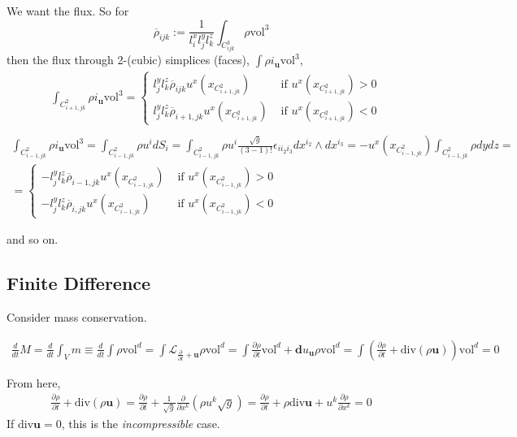 \documentclass[10pt]{amsart}
\begin{document}
\begin{multicols*}{2}
We want the flux.  So for
\[
\overline{\rho}_{ijk} := \frac{1}{l_i^x l_j^yl^z_k} \int_{C^3_{ijk}} \rho \text{vol}^3
\]
then the flux through 2-(cubic) simplices (faces), $\int \rho i_{\mathbf{u}}\text{vol}^3$,
\[
\begin{aligned}
 &  \int_{C^2_{i+1,jk}} \rho i_{\mathbf{u}} \text{vol}^3 = \begin{cases} l_j^yl_k^z \overline{\rho}_{ijk} u^x(x_{C^2_{i+1, jk} } ) & \text{ if } u^x(x_{C^2_{i+1,jk} }) > 0 \\ 
 l_j^y l^z_k \overline{\rho}_{i+1,jk} u^x(x_{C^2_{i+1, jk} } ) & \text{ if } u^x(x_{C^2_{i+1,jk} }) < 0 \end{cases} \\
\end{aligned}
\]
\[
\begin{gathered}
  \int_{C^2_{i-1,jk}} \rho i_{\mathbf{u}} \text{vol}^3 = \int_{C^2_{i-1,jk}} \rho u^i dS_i = \int_{C^2_{i-1,jk}} \rho u^i \frac{ \sqrt{g}}{ (3-1)!} \epsilon_{ii_2i_3} dx^{i_2} \wedge dx^{i_3} = -u^x(x_{C^2_{i-1,jk}}) \int_{C^2_{i-1,jk} } \rho dy dz = \\
  = \begin{cases}
    -l_j^y l^z_k \overline{\rho}_{i-1,jk} u^x(x_{C^2_{i-1,jk}}) & \text{ if } u^x(x_{C^2_{i-1,jk}}) > 0 \\
        -l_j^y l^z_k \overline{\rho}_{i,jk} u^x(x_{C^2_{i-1,jk}}) & \text{ if } u^x(x_{C^2_{i-1,jk}}) < 0 
    \end{cases}
\end{gathered}
\]

and so on.




\subsection{Finite Difference}

Consider mass conservation.

\[
\begin{gathered}
\frac{d}{dt} M  = \frac{d}{dt} \int_V m \equiv \frac{d}{dt} \int \rho \text{vol}^d = \int \mathcal{L}_{ \frac{ \partial }{ \partial t} + \mathbf{u} } \rho \text{vol}^d = \int \frac{ \partial \rho }{ \partial t} \text{vol}^d + \mathbf{d}u_{\mathbf{u}}\rho \text{vol}^d = \int \left( \frac{ \partial \rho}{ \partial t} + \text{div}(\rho \mathbf{u} ) \right) \text{vol}^d = 0 
\end{gathered}
\]

From here,
\[
\begin{gathered}
  \frac{ \partial \rho }{ \partial t} + \text{div}(\rho \mathbf{u}) = \frac{ \partial \rho }{ \partial t} + \frac{1}{\sqrt{g}} \frac{ \partial }{ \partial x^k} (\rho u^k \sqrt{g}) = \frac{ \partial \rho}{ \partial t} + \rho \text{div}\mathbf{u} + u^k \frac{ \partial \rho }{ \partial x^k} = 0
  \end{gathered}
\]
If $\text{div}\mathbf{u} = 0$, this is the \emph{incompressible} case.


\end{multicols*}
\end{document}
